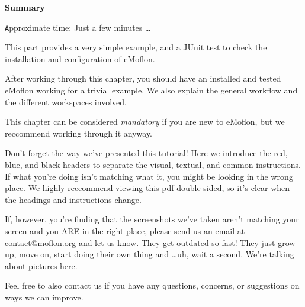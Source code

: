\vspace*{2cm}

{\Huge \bfseries Summary}
\vspace{0.5cm}

{\small \texttt Approximate time: Just a few minutes \ldots}

This part provides a very simple example, and a JUnit test to check the installation and configuration of eMoflon.

After working through this chapter, you should have an installed and tested eMoflon working for a trivial example.
We also explain the general workflow and the different workspaces involved.

This chapter can be considered \emph{mandatory} if you are new to eMoflon, but we reccommend working through it anyway.

Don't forget the way we've presented this tutorial! Here we introduce the red, blue, and black headers to separate the visual, textual, and common instructions. 
If what you're doing isn't matching what it, you might be looking in the wrong place. We highly reccommend viewing this pdf double sided, so it's clear when the headings and instructions change.

If, however, you're finding that the screenshots we've taken aren't matching your screen and you ARE in the right place, please send us an email at \href{mailto:contact@moflon.org}{contact@moflon.org} and let us know. They get outdated so fast! They just grow up, move on, start doing their own thing and \ldots uh, wait a second. We're talking about pictures here.

Feel free to also contact us if you have any questions, concerns, or suggestions on ways we can improve.